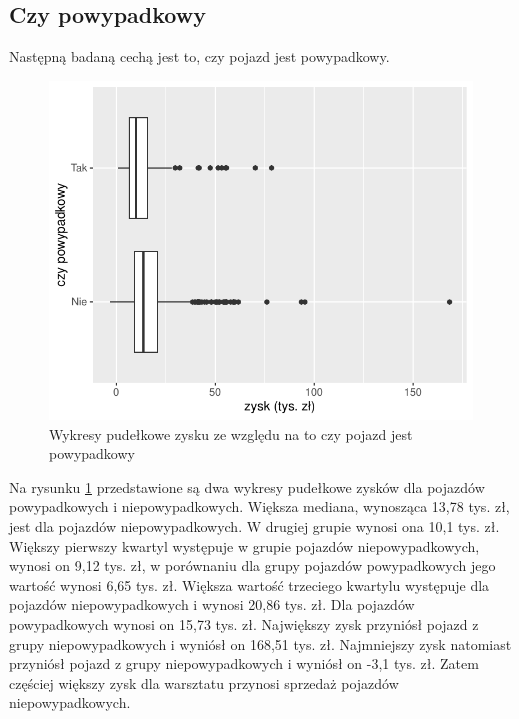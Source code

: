 \documentclass{article}\usepackage[]{graphicx}\usepackage[]{xcolor}
\makeatletter
\def\maxwidth{ %
  \ifdim\Gin@nat@width>\linewidth
    \linewidth
  \else
    \Gin@nat@width
  \fi
}
\newenvironment{knitrout}{}{} %
\makeatother
\begin{document}
\subsection{Czy powypadkowy}

Następną badaną cechą jest to, czy pojazd jest powypadkowy.

\begin{knitrout}
\color{fgcolor}\begin{figure}[H]

{\centering \includegraphics[width=\maxwidth]{figure/fig_wypadkowy-1} 

}

\caption[Wykresy pudełkowe zysku ze względu na to czy pojazd jest powypadkowy]{Wykresy pudełkowe zysku ze względu na to czy pojazd jest powypadkowy}\label{fig:fig_wypadkowy}
\end{figure}

\end{knitrout}

Na rysunku \ref{fig:fig_wypadkowy} przedstawione są dwa wykresy pudełkowe zysków dla pojazdów powypadkowych i niepowypadkowych. Większa mediana, wynosząca 13,78 tys. zł, jest dla pojazdów niepowypadkowych. W drugiej grupie wynosi ona 10,1 tys. zł. 
Większy pierwszy kwartyl występuje w grupie pojazdów niepowypadkowych, wynosi on 9,12 tys. zł, w porównaniu dla grupy pojazdów powypadkowych jego wartość wynosi 6,65 tys. zł.
Większa wartość trzeciego kwartylu występuje dla pojazdów niepowypadkowych i wynosi 20,86 tys. zł. Dla pojazdów powypadkowych wynosi on 15,73 tys. zł.
Największy zysk przyniósł pojazd z grupy niepowypadkowych i wyniósł on 168,51 tys. zł. 
Najmniejszy zysk natomiast przyniósł pojazd z grupy niepowypadkowych i wyniósł on -3,1 tys. zł. Zatem częściej większy zysk dla warsztatu przynosi sprzedaż pojazdów niepowypadkowych. 
\end{document}
